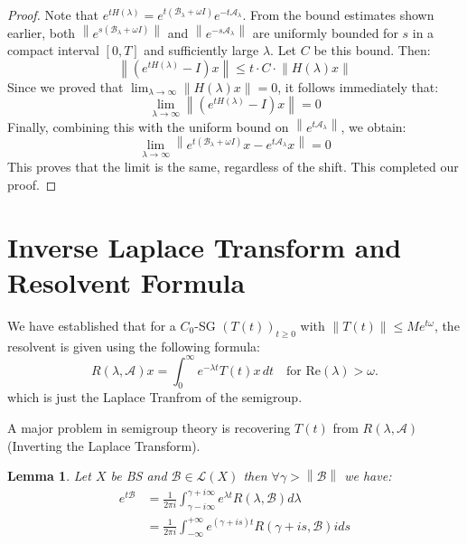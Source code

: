 \documentclass[12pt, oneside]{book}
\newtheorem{lemma}{Lemma}[section]
\newcommand{\norm}[1]{\left\lVert#1\right\rVert}
\newcommand{\A}{\mathscr{A}}
\newcommand{\B}{\mathscr{B}}
\renewcommand{\L}{\mathcal{L}}
\begin{document}
\begin{proof}
Note that $e^{tH(\lambda)} = e^{t(\B_\lambda + \omega I)} e^{-t \A_\lambda}$. From the bound estimates shown earlier, both $\norm{e^{s(\B_\lambda + \omega I)}}$ and $\norm{e^{-s \A_\lambda}}$ are uniformly bounded for $s$ in a compact interval $[0, T]$ and sufficiently large $\lambda$. Let $C$ be this bound. Then:
$$
\norm{(e^{t H(\lambda)} - I) x} \le t \cdot C \cdot \norm{H(\lambda)x}
$$
Since we proved that $\lim_{\lambda \to \infty} \norm{H(\lambda)x} = 0$, it follows immediately that:
$$
\lim_{\lambda \to \infty} \norm{(e^{t H(\lambda)} - I) x} = 0
$$
Finally, combining this with the uniform bound on $\norm{e^{t \A_\lambda}}$, we obtain:
$$
\lim_{\lambda \to \infty} \norm{e^{t (\B_\lambda + \omega I)} x - e^{t \A_\lambda} x} = 0
$$
This proves that the limit is the same, regardless of the shift. This completed our proof.
\end{proof}

\section{Inverse Laplace Transform and Resolvent Formula}

We have established that for a $C_0$-SG $\left(T(t)\right)_{t \ge 0}$ with $\norm{T(t)} \le Me^{t\omega}$, the resolvent is given using the following formula:
$$
R(\lambda,\A)x = \int_0^\infty e^{-\lambda t} T(t)x \, dt \quad \text{for } \text{Re}(\lambda) > \omega.
$$
which is just the Laplace Tranfrom of the semigroup.

A major problem in semigroup theory is recovering $T(t)$ from $R(\lambda,\A)$ (Inverting the Laplace Transform).

\begin{lemma}
	Let $X$ be BS and $\B \in \L(X)$ then $\forall \gamma > \norm{\B}$ we have:
	\begin{align*}
	e^{t\B} &= \frac{1}{2 \pi i} \int_{\gamma - i\infty}^{\gamma + i\infty} e^{\lambda t} R(\lambda, \B) d\lambda \\
		&= \frac{1}{2 \pi i} \int_{- \infty}^{+ \infty} e^{(\gamma + is)t} R(\gamma + is, \B) i ds
	\end{align*}
\end{lemma}
\end{document}
